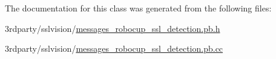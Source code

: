 The documentation for this class was generated from the following files\-:\begin{DoxyCompactItemize}
\item 
3rdparty/sslvision/\hyperlink{messages__robocup__ssl__detection_8pb_8h}{messages\-\_\-robocup\-\_\-ssl\-\_\-detection.\-pb.\-h}\item 
3rdparty/sslvision/\hyperlink{messages__robocup__ssl__detection_8pb_8cc}{messages\-\_\-robocup\-\_\-ssl\-\_\-detection.\-pb.\-cc}\end{DoxyCompactItemize}
